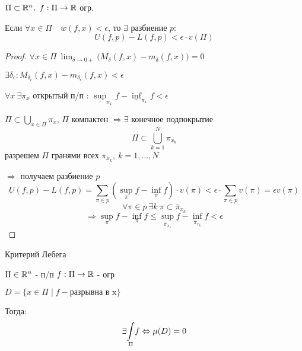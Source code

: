     \begin{lemma}
        $\Pi \subset \mathbb{R}^n, \ f : \Pi \rightarrow \mathbb{R}$ огр.
        \par Если $\forall x \in \Pi \quad w(f, x) < \epsilon$, то  $\exists$ разбиение $p$:
        \[
            U(f, p) - L(f, p) < \epsilon \cdot v(\Pi)    
        \]
    \end{lemma}
    \begin{proof}
        $\forall x \in \Pi \ \lim_{\delta \rightarrow 0+}\big(M_\delta(f, x) - m_\delta(f, x)\big) = 0 $
        \par $\exists \delta_\epsilon : M_{\delta_\epsilon}(f, x) - m_{\delta_\epsilon}(f, x) < \epsilon$
        \par $\forall x \ \exists \pi_x$ открытый п/п : $\underline{\sup}_{\pi_x} f - \underline{\inf}_{\pi_x} f < \epsilon$
        \par $\Pi \subset \bigcup_{x \in \Pi} \pi_x$, $\Pi$ компактен $\Rightarrow \exists$ конечное подпокрытие
        \[
            \Pi \subset \bigcup_{k=1}^N \pi_{x_k}    
        \]
        разрешем $\Pi$ гранями всех $\pi_{x_k}, \ k = 1, \dots, N$
        \par $\Rightarrow$ получаем разбиение $p$
        \[
            U(f, p) - L(f, p) = \sum_{\pi \in p} (\sup_\pi f - \inf_\pi f) \cdot v(\pi) < \epsilon \cdot \sum_{\pi \in p} v(\pi) = \epsilon v(\pi)    
        \]
        \[
            \forall \pi \in p \ \exists k \ \pi \subset \bar \pi_{x_k}    
        \]
        \[
            \Rightarrow \sup_\pi f - \inf_\pi f \le \sup_{\bar \pi_{x_k}} f - \inf_{\bar \pi_{x_k}} f < \epsilon
        \]
    \end{proof}

    \begin{theorem}
        Критерий Лебега    

        \par $\Pi \in \mathbb{R}^n$ - п/п $f: \Pi \rightarrow \mathbb{R}$ - огр 
        \par $D = \{x \in \Pi \mid f - \text{разрывна в x}\}$
        \par Тогда:
        $$\exists \underset{\Pi}{\int} f \Leftrightarrow \mu(D)=0$$
    \end{theorem}

